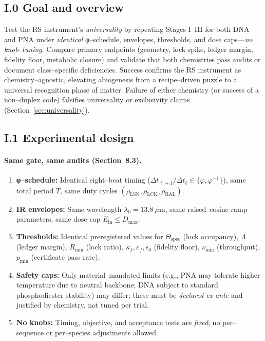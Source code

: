 \documentclass[11pt]{article}
\begin{document}
\subsection*{I.0 Goal and overview}
Test the RS instrument's \emph{universality} by repeating Stages I–III for both DNA and PNA under \emph{identical} φ–schedule, envelopes, thresholds, and dose caps—\emph{no knob–tuning}. Compare primary endpoints (geometry, lock spike, ledger margin, fidelity floor, metabolic closure) and validate that both chemistries pass audits or document class–specific deficiencies. Success confirms the RS instrument as chemistry–agnostic, elevating abiogenesis from a recipe–driven puzzle to a universal recognition phase of matter. Failure of either chemistry (or success of a non–duplex code) falsifies universality or exclusivity claims (Section~\ref{sec:universality}).

\subsection*{I.1 Experimental design}

\paragraph{Same gate, same audits (Section~8.3).}
\begin{enumerate}
\item \textbf{φ–schedule:} Identical eight–beat timing ($\Delta t_{\ell+1}/\Delta t_\ell\in\{\varphi,\varphi^{-1}\}$), same total period $T$, same duty cycles $(\rho_{\mathrm{LSN}},\rho_{\mathrm{LCK}},\rho_{\mathrm{BAL}})$.
\item \textbf{IR envelopes:} Same wavelength $\lambda_0=13.8~\mu$m, same raised–cosine ramp parameters, same dose cap $E_{\mathrm{in}}\le D_{\max}$.
\item \textbf{Thresholds:} Identical preregistered values for $\Theta_{\mathrm{spec}}$ (lock occupancy), $\Lambda$ (ledger margin), $R_{\min}$ (lock ratio), $\kappa_f,\varepsilon_f,\epsilon_0$ (fidelity floor), $\nu_{\min}$ (throughput), $p_{\min}$ (certificate pass rate).
\item \textbf{Safety caps:} Only material–mandated limits (e.g., PNA may tolerate higher temperature due to neutral backbone; DNA subject to standard phosphodiester stability) may differ; these must be \emph{declared ex ante} and justified by chemistry, not tuned per trial.
\item \textbf{No knobs:} Timing, objective, and acceptance tests are \emph{fixed}; no per–sequence or per–species adjustments allowed.
\end{enumerate}
\end{document}
